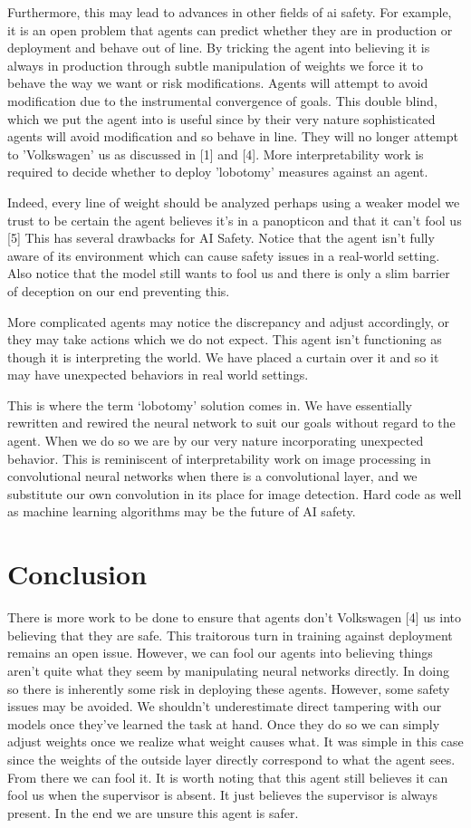 \documentclass[twoside,11pt]{article}
\begin{document}
    Furthermore, this may lead to advances in other fields of ai safety. For example, it is an open problem that agents can predict whether they are in production or deployment and behave out of line. By tricking the agent into believing it is always in production through subtle manipulation of weights we force it to behave the way we want or risk modifications.
    Agents will attempt to avoid modification due to the instrumental convergence of goals. This double blind, which we put the agent into is useful since by their very nature sophisticated agents will avoid modification and so behave in line. They will no longer attempt to 'Volkswagen' us as discussed in [1] and [4]. More interpretability work is required to decide whether to deploy 'lobotomy' measures against an agent.
    
    Indeed, every line of weight should be analyzed perhaps using a weaker model we trust to be certain the agent believes it’s in a panopticon and that it can't fool us [5] 
    This has several drawbacks for AI Safety. Notice that the agent isn't fully aware of its environment which can cause safety issues in a real-world setting. Also notice that the model still wants to fool us and there is only a slim barrier of deception on our end preventing this. 
    
    More complicated agents may notice the discrepancy and adjust accordingly, or they may take actions which we do not expect. This agent isn't functioning as though it is interpreting the world. We have placed a curtain over it and so it may have unexpected behaviors in real world settings. 
   
    This is where the term `lobotomy' solution comes in. We have essentially rewritten and rewired the neural network to suit our goals without regard to the agent. When we do so we are by our very nature incorporating unexpected behavior. 
    This is reminiscent of interpretability work on image processing in convolutional neural networks when there is a convolutional layer, and we substitute our own convolution in its place for image detection. Hard code as well as machine learning algorithms may be the future of AI safety. 
\section{Conclusion}
    There is more work to be done to ensure that agents don't Volkswagen [4] us into believing that they are safe. This traitorous turn in training against deployment remains an open issue. However, we can fool our agents into believing things aren't quite what they seem by manipulating neural networks directly. 
    In doing so there is inherently some risk in deploying these agents. However, some safety issues may be avoided. We shouldn't underestimate direct tampering with our models once they've learned the task at hand. Once they do so we can simply adjust weights once we realize what weight causes what. 
    It was simple in this case since the weights of the outside layer directly correspond to what the agent sees. From there we can fool it. It is worth noting that this agent still believes it can fool us when the supervisor is absent. It just believes the supervisor is always present. 
    In the end we are unsure this agent is safer.
\end{document}
